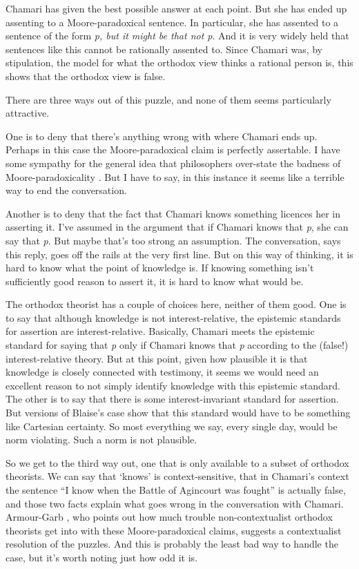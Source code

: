 \documentclass[
  11pt,
]{book}
\begin{document}
Chamari has given the best possible answer at each point. But she has ended up assenting to a Moore-paradoxical sentence. In particular, she has assented to a sentence of the form \emph{p, but it might be that not p}. And it is very widely held that sentences like this cannot be rationally assented to. Since Chamari was, by stipulation, the model for what the orthodox view thinks a rational person is, this shows that the orthodox view is false.

There are three ways out of this puzzle, and none of them seems particularly attractive.

One is to deny that there's anything wrong with where Chamari ends up. Perhaps in this case the Moore-paradoxical claim is perfectly assertable. I have some sympathy for the general idea that philosophers over-state the badness of Moore-paradoxicality \citep{MaitraWeatherson2010}. But I have to say, in this instance it seems like a terrible way to end the conversation.

Another is to deny that the fact that Chamari knows something licences her in asserting it. I've assumed in the argument that if Chamari knows that \emph{p}, she can say that \emph{p}. But maybe that's too strong an assumption. The conversation, says this reply, goes off the rails at the very first line. But on this way of thinking, it is hard to know what the point of knowledge is. If knowing something isn't sufficiently good reason to assert it, it is hard to know what would be.

The orthodox theorist has a couple of choices here, neither of them good. One is to say that although knowledge is not interest-relative, the epistemic standards for assertion are interest-relative. Basically, Chamari meets the epistemic standard for saying that \emph{p} only if Chamari knows that \emph{p} according to the (false!) interest-relative theory. But at this point, given how plausible it is that knowledge is closely connected with testimony, it seems we would need an excellent reason to not simply identify knowledge with this epistemic standard. The other is to say that there is some interest-invariant standard for assertion. But versions of Blaise's case show that this standard would have to be something like Cartesian certainty. So most everything we say, every single day, would be norm violating. Such a norm is not plausible.

So we get to the third way out, one that is only available to a subset of orthodox theorists. We can say that `knows' is context-sensitive, that in Chamari's context the sentence ``I know when the Battle of Agincourt was fought'' is actually false, and those two facts explain what goes wrong in the conversation with Chamari. Armour-Garb \citeyearpar{ArmourGarb2011}, who points out how much trouble non-contextualist orthodox theorists get into with these Moore-paradoxical claims, suggests a contextualist resolution of the puzzles. And this is probably the least bad way to handle the case, but it's worth noting just how odd it is.
\end{document}
